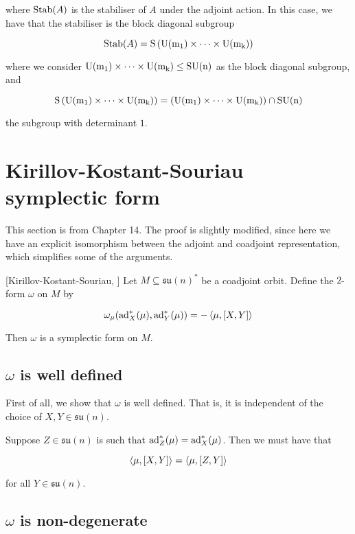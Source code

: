 \documentclass{article}
\DeclareMathOperator{\SU}{SU}
\newcommand{\su}{\mathfrak{su}}
\begin{document}
where \(\operatorname{Stab}(A)\) is the stabiliser of \(A\) under the adjoint action. In this case, we have that the stabiliser is the block diagonal subgroup

\[\operatorname{Stab}(A) = \rm S\left(\rm U(m_1) \times \dots \times \rm U(m_k)\right)\]

where we consider \(\rm U(m_1) \times \cdots \times \rm U(m_k) \le \SU(n)\) as the block diagonal subgroup, and

\[\rm S\left(\rm U(m_1) \times \dots \times \rm U(m_k)\right) = \left(\rm U(m_1) \times \cdots \times \rm U(m_k)\right) \cap \SU(n)\]

the subgroup with determinant \(1\).

\section{Kirillov-Kostant-Souriau symplectic form}

\label{sec:kks}

This section is from \cite{marsden_ratiu} Chapter 14. The proof is slightly modified, since here we have an explicit isomorphism between the adjoint and coadjoint representation, which simplifies some of the arguments.

\begin{theorem}
    \label{thm:kks}
    [Kirillov-Kostant-Souriau, \cite[Theorem 14.4.1]{marsden_ratiu}]
    Let \(M \subseteq \su(n)^*\) be a coadjoint orbit. Define the \(2\)-form \(\omega\) on \( M\) by

    \[\omega_\mu(\operatorname{ad}_X^*(\mu), \operatorname{ad}_Y^*(\mu)) = -\left\langle \mu, [X, Y] \right\rangle\]

    Then \(\omega\) is a symplectic form on \( M\).
\end{theorem}

\subsection{\(\omega\) is well defined}

First of all, we show that \(\omega\) is well defined. That is, it is independent of the choice of \(X, Y \in \su(n)\).

Suppose \(Z \in \su(n)\) is such that \(\operatorname{ad}_Z^*(\mu) = \operatorname{ad}_X^*(\mu)\). Then we must have that

\[\left\langle \mu, [X, Y] \right\rangle = \left\langle \mu, [Z, Y] \right\rangle\]

for all \(Y \in \su(n)\).

\subsection{\(\omega\) is non-degenerate}
\end{document}
